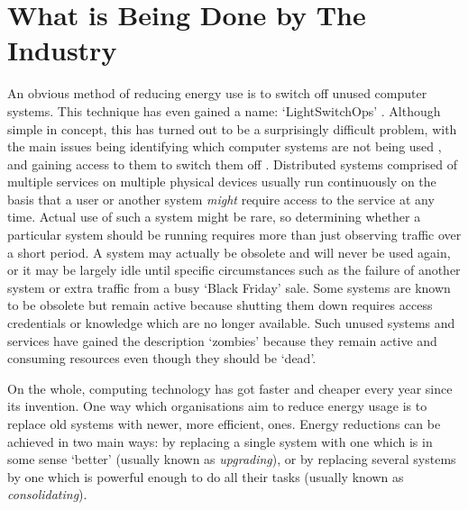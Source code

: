 \section{What is Being Done by The Industry}
\label{section:industry}

An obvious method of reducing energy use is to switch off unused computer systems. This technique has even gained a name: `LightSwitchOps' \citep{RedHat2022}. Although simple in concept, this has turned out to be a surprisingly difficult problem, with the main issues being identifying which computer systems are not being used \citep{Lechelt2024}, and gaining access to them to switch them off \citep{Wiggers2023}. Distributed systems comprised of multiple services on multiple physical devices usually run continuously on the basis that a user or another system \emph{might} require access to the service at any time. Actual use of such a system might be rare, so determining whether a particular system should be running requires more than just observing traffic over a short period. A system may actually be obsolete and will never be used again, or it may be largely idle until specific circumstances such as the failure of another system or extra traffic from a busy `Black Friday' sale. Some systems are known to be obsolete but remain active because shutting them down requires access credentials or knowledge which are no longer available. Such unused systems and services have gained the description `\gls{zombie}s' because they remain active and consuming resources even though they should be `dead'. 

On the whole, computing technology has got faster and cheaper every year since its invention. One way which organisations aim to reduce energy usage is to replace old systems with newer, more efficient, ones. Energy reductions can be achieved in two main ways: by replacing a single system with one which is in some sense `better' (usually known as \emph{\gls{upgrading}}), or by replacing several systems by one which is powerful enough to do all their tasks (usually known as \emph{\gls{consolidating}}).

